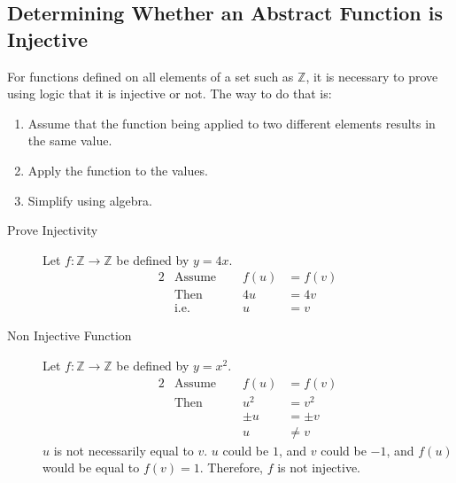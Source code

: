 \documentclass[../notes.tex]{subfiles}
\begin{document}
			\subsection{Determining Whether an Abstract Function is Injective}
				For functions defined on all elements of a set such as $\mathbb{Z}$, it is necessary to prove using logic that it is injective or not. The way to do that is:
				\begin{enumerate}
					\item Assume that the function being applied to two different elements results in the same value.
					\item Apply the function to the values.
					\item Simplify using algebra.
				\end{enumerate}
				\begin{examplebox}
					\begin{description}
						\item[Prove Injectivity] Let $f: \mathbb{Z} \rightarrow \mathbb{Z}$ be defined by $y = 4x$.
							\begin{alignat*}{2}
								& \text{Assume } \quad &f(u) &= f(v)\tag*{$(1)$}\\
								& \text{Then } &4u &= 4v\tag*{$(2)$}\\
								& \text{i.e. } &u &= v\tag*{$(3)$}
							\end{alignat*}
						\item[Non Injective Function]  Let $f: \mathbb{Z} \rightarrow \mathbb{Z}$ be defined by $y = x^{2}$.
							\begin{alignat*}{2}
								& \text{Assume } \quad &f(u) &= f(v)\\
								& \text{Then } &u^{2} &= v^{2}\\
								& & \pm{u} &= \pm{v}\\
								& & u &\neq v
							\end{alignat*}
							$u$ is not necessarily equal to $v$. $u$ could be $1$, and $v$ could be $-1$, and $f(u)$ would be equal to $f(v) = 1$. Therefore, $f$ is not injective.
					\end{description}
				\end{examplebox}
\end{document}
